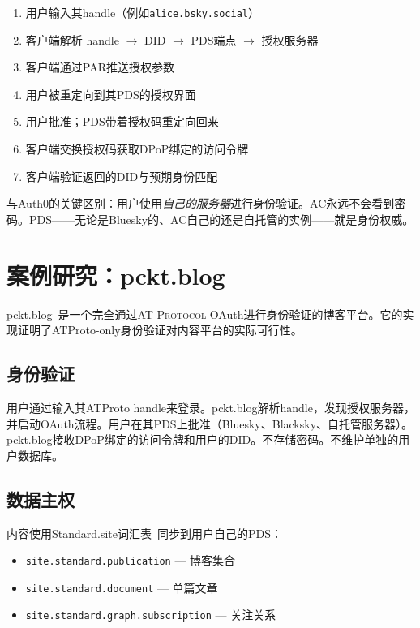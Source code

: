 \documentclass[10pt,letterpaper,twocolumn]{article}
\newcommand{\atproto}{\textsc{AT Protocol}}
\begin{document}
\begin{enumerate}
  \item 用户输入其handle（例如\texttt{alice.bsky.social}）
  \item 客户端解析 handle $\to$ DID $\to$ PDS端点 $\to$ 授权服务器
  \item 客户端通过PAR推送授权参数
  \item 用户被重定向到其PDS的授权界面
  \item 用户批准；PDS带着授权码重定向回来
  \item 客户端交换授权码获取DPoP绑定的访问令牌
  \item 客户端验证返回的DID与预期身份匹配
\end{enumerate}

与Auth0的关键区别：用户使用\emph{自己的服务器}进行身份验证。AC永远不会看到密码。PDS——无论是Bluesky的、AC自己的还是自托管的实例——就是身份权威。


\section{案例研究：pckt.blog}
\label{sec:pckt}

pckt.blog~\citep{pcktblog2025}是一个完全通过\atproto{} OAuth进行身份验证的博客平台。它的实现证明了ATProto-only身份验证对内容平台的实际可行性。

\subsection{身份验证}

用户通过输入其ATProto handle来登录。pckt.blog解析handle，发现授权服务器，并启动OAuth流程。用户在其PDS上批准（Bluesky、Blacksky、自托管服务器）。pckt.blog接收DPoP绑定的访问令牌和用户的DID。不存储密码。不维护单独的用户数据库。

\subsection{数据主权}

内容使用Standard.site词汇表~\citep{standardsite2025}同步到用户自己的PDS：

\begin{itemize}
  \item \texttt{site.standard.publication} --- 博客集合
  \item \texttt{site.standard.document} --- 单篇文章
  \item \texttt{site.standard.graph.subscription} --- 关注关系
\end{itemize}
\end{document}
